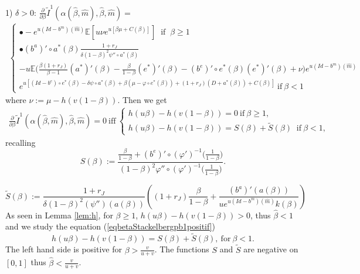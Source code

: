 \documentclass{svjour3}
\begin{document}
\vspace{5mm}

1) \underline{ $\delta>0$}: 
$\frac{\partial}{\partial\beta}
\tilde I^1(\alpha(\hat\beta,\hat m),\hat\beta,\hat m)   =
$
\begin{align*}
 \begin{cases}
\bullet -e^{u(Id-b^m)(\hat m)}
 \mathbb{E}\left[u\nu
e^{u[\beta\mu+C(\beta)]}\right]~\mbox{ if }~\beta\geq 1
\\
\bullet (b^a)'\circ a^*(\beta)
\frac{1+r_J}{\delta(1-\beta)^2 \psi''\circ a^*(\beta)}
\\
-u\mathbb{E}\Big(\frac{\beta(1+r_J)}{\beta-1}(a^*)'(\beta)-
\frac{\beta}{1-\beta}(e^*)'(\beta)-(b^e)'\circ e^*(\beta)(e^*)'(\beta)+\nu\Big)
e^{u(Id-b^m)(\hat m)}
\\
e^{u[(Id-b^e)\circ e^*(\beta)- \delta \psi\circ a^*(\beta)
 +\beta(\mu-\varphi\circ e^*(\beta))+(1+r_J)(D+a^*(\beta))+C(\beta)]}~
 \mbox{if}~\beta<1
\end{cases}
\end{align*}
where $\nu:=\mu-h(v(1-\beta))$. Then we get
\begin{align*}
\frac{\partial}{\partial \beta} \tilde I^1(\alpha(\hat\beta,\hat m),\hat\beta,\hat m)   = 0  ~\mbox{iff}~ 
\begin{cases}
h(u\beta)-h(v(1-\beta))=0   ~\mbox{if}~\beta\geq 1,
\\
h(u\beta)-h(v(1-\beta))=S(\beta) +\widetilde{S} (\beta) ~\mbox{ if}~\beta<1,
\end{cases}
\end{align*}
recalling
$$S(\beta):= \frac{\frac{\beta}{1-\beta}+(b^e)'\circ(\varphi')^{-1}\Big(\frac{1}{1-\beta}\Big)}{(1-\beta)^2\varphi''\circ(\varphi')^{-1}\Big(\frac{1}{1-\beta}\Big)}.
$$

$$
\widetilde{S}(\beta):= \frac{1+r_J}{\delta(1-\beta)^2 (\psi'')(a(\beta)) } \left(  (1+r_J)\frac{\beta}{1-\beta} +  \frac{(b^a)'(a(\beta))}{ u   e^{u(Id-b^m)(\hat m)}  k(\beta)  }      \right)
$$
As seen in Lemma \ref{lem:h}, for $\beta\geq 1$, $h(u\beta)-h(v(1-\beta))>0$, thus 
$\hat\beta<1$ and we study the equation 
(\ref{eqbetaStackelbergpb1positif})
$$
h(u\beta)-h(v(1-\beta))=S(\beta)+\widetilde{S} (\beta),  ~\mbox{for}~ \beta<1. 
$$
The left hand side is positive  for $\beta>\frac{v}{u+v} $. The functions $S$ and $\widetilde{S}$ are negative on $[0,1]$ thus $\hat\beta<\frac{v}{u+v}$.

\vspace{5mm}
\end{document}
